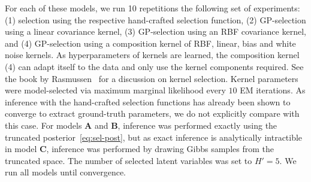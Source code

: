For each of these models, we run 10 repetitions the following set of experiments: (1) selection using the respective hand-crafted selection function,
(2) GP-selection using a linear covariance kernel, (3) GP-selection using an RBF covariance kernel, and (4) GP-selection using a composition kernel of RBF, linear, bias and white noise kernels.
As hyperparameters of kernels are learned, the composition kernel (4) can adapt itself to the data and only use the kernel components required. 
See the book by Rasmussen~\citep{RasmussenGPbook} for a discussion on kernel selection.
Kernel parameters were model-selected via maximum marginal likelihood every $10$ EM iterations.
As inference with the hand-crafted selection functions has already been shown to converge to extract ground-truth parameters, we do not explicitly compare with this case.
For models \textbf{A} and \textbf{B}, inference was performed exactly using the truncated posterior~\eqref{eq:sel-post}, but as exact inference is analytically intractible in model \textbf{C}, inference was performed by drawing Gibbs samples from the truncated space.
The number of selected latent variables was set to $H'=5$.
%
We run all models until convergence. %


